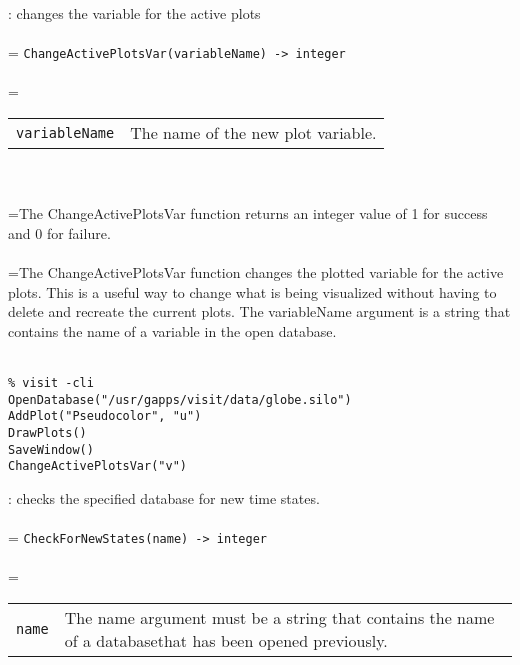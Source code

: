 \documentclass[10pt,a4paper]{report}
\begin{document}
{}
: changes the variable for the active plots\\[-3mm]

 \\ 
\hangindent=\parindent 
\verb!ChangeActivePlotsVar(variableName) -> integer!\\ [-3mm]

 \\ 
\hangindent=\parindent 
\begin{tabular}{ll}
\verb!variableName! & The name of the new plot variable. \\
\end{tabular} \\[-2mm]


 \\ 
\hangindent=\parindent The ChangeActivePlotsVar function returns an integer value of 1 for success and 0 for failure. \\[-3mm] 

 \\ 
\hangindent=\parindent The ChangeActivePlotsVar function changes the plotted variable for the active plots. This is a useful way to change what is being visualized without having to delete and recreate the current plots. The variableName argument is a string that contains the name of a variable in the open database. \\[-3mm] 

\\[-6mm]
\begin{verbatim}% visit -cli
OpenDatabase("/usr/gapps/visit/data/globe.silo")
AddPlot("Pseudocolor", "u")
DrawPlots()
SaveWindow()
ChangeActivePlotsVar("v")
\end{verbatim}
\newpage


{}
: checks the specified database for new time states.\\[-3mm]

 \\ 
\hangindent=\parindent 
\verb!CheckForNewStates(name) -> integer!\\ [-3mm]

 \\ 
\hangindent=\parindent 
\begin{tabular}{lp{9cm}}
\verb!name! & The name argument must be a string that contains the name of a databasethat has been opened previously. \\
\end{tabular} \\[-2mm]
\end{document}
